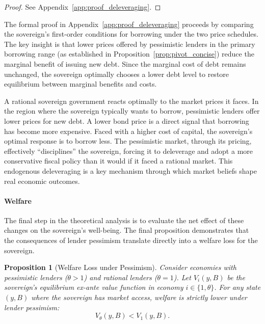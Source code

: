 \documentclass[12pt]{article}
\theoremstyle{plain}
\newtheorem{proposition}{Proposition}
\begin{document}
\begin{proof}
	See Appendix~\ref{app:proof_deleveraging}.
\end{proof}

The formal proof in Appendix~\ref{app:proof_deleveraging} proceeds by comparing
the sovereign's first-order conditions for borrowing under the two price
schedules. The key insight is that lower prices offered by pessimistic lenders
in the primary borrowing range (as established in
Proposition~\ref{prop:pivot_concise}) reduce the marginal benefit of issuing
new debt. Since the marginal cost of debt remains unchanged, the sovereign
optimally chooses a lower debt level to restore equilibrium between marginal
benefits and costs.

A rational sovereign government reacts optimally to the market prices it faces.
In the region where the sovereign typically wants to borrow, pessimistic
lenders offer lower prices for new debt. A lower bond price is a direct signal
that borrowing has become more expensive. Faced with a higher cost of capital,
the sovereign's optimal response is to borrow less. The pessimistic market,
through its pricing, effectively ``disciplines'' the sovereign, forcing it to
deleverage and adopt a more conservative fiscal policy than it would if it
faced a rational market. This endogenous deleveraging is a key mechanism
through which market beliefs shape real economic outcomes.

\paragraph{Welfare}
The final step in the theoretical analysis is to evaluate the net effect of
these changes on the sovereign's well-being. The final proposition demonstrates
that the consequences of lender pessimism translate directly into a welfare
loss for the sovereign.

\begin{proposition}[Welfare Loss under Pessimism]
	\label{prop:welfare}
	Consider economies with pessimistic lenders ($\theta > 1$) and rational lenders ($\theta = 1$). Let $V_i(y, B)$ be the sovereign's equilibrium ex-ante value function in economy $i \in \{1, \theta\}$. For any state $(y, B)$ where the sovereign has market access, welfare is strictly lower under lender pessimism:
	\begin{equation*}
		V_\theta(y, B) < V_1(y, B).
	\end{equation*}
\end{proposition}
\end{document}
